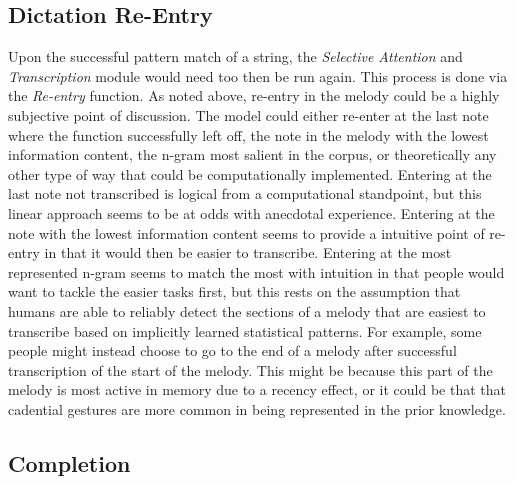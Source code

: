 \documentclass[]{book}
\begin{document}
\hypertarget{dictation-re-entry}{%
\subsection{Dictation Re-Entry}\label{dictation-re-entry}}

Upon the successful pattern match of a string, the \emph{Selective Attention} and \emph{Transcription} module would need too then be run again.
This process is done via the \emph{Re-entry} function.
As noted above, re-entry in the melody could be a highly subjective point of discussion.
The model could either re-enter at the last note where the function successfully left off, the note in the melody with the lowest information content, the n-gram most salient in the corpus, or theoretically any other type of way that could be computationally implemented.
Entering at the last note not transcribed is logical from a computational standpoint, but this linear approach seems to be at odds with anecdotal experience.
Entering at the note with the lowest information content seems to provide a intuitive point of re-entry in that it would then be easier to transcribe.
Entering at the most represented n-gram seems to match the most with intuition in that people would want to tackle the easier tasks first, but this rests on the assumption that humans are able to reliably detect the sections of a melody that are easiest to transcribe based on implicitly learned statistical patterns.
For example, some people might instead choose to go to the end of a melody after successful transcription of the start of the melody.
This might be because this part of the melody is most active in memory due to a recency effect, or it could be that that cadential gestures are more common in being represented in the prior knowledge.

\hypertarget{completion}{%
\subsection{Completion}\label{completion}}
\end{document}
